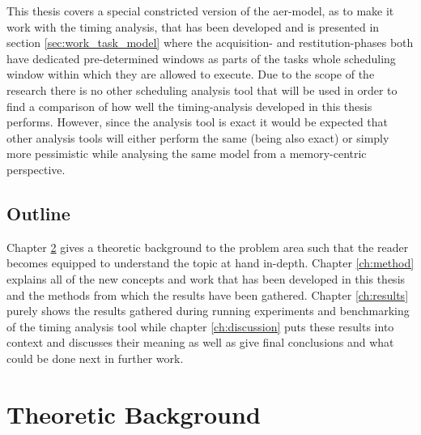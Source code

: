 \documentclass{kththesis}
\begin{document}
This thesis covers a special constricted version of the \acrshort{aer}-model, as to make it work
with the timing analysis, that has been developed and is presented in section
\ref{sec:work_task_model} where the acquisition- and restitution-phases both have dedicated
pre-determined windows as parts of the tasks whole scheduling window within which they are allowed
to execute. Due to the scope of the research there is no other scheduling analysis tool that
will be used in order to find a comparison of how well the timing-analysis developed in this thesis
performs. However, since the analysis tool is exact it would be expected that other analysis tools
will either perform the same (being also exact) or simply more pessimistic while analysing the same
model from a memory-centric perspective.


\section{Outline}

Chapter \ref{ch:theoretic_background} gives a theoretic background to the problem area such that the
reader becomes equipped to understand the topic at hand in-depth. Chapter \ref{ch:method} explains
all of the new concepts and work that has been developed in this thesis and the methods from which
the results have been gathered. Chapter \ref{ch:results} purely shows the results gathered during
running experiments and benchmarking of the timing analysis tool while chapter \ref{ch:discussion}
puts these results into context and discusses their meaning as well as give final conclusions and
what could be done next in further work.


\chapter{Theoretic Background}\label{ch:theoretic_background}
\end{document}
